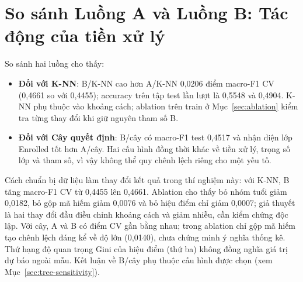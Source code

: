 \section{So sánh Luồng A và Luồng B: Tác động của tiền xử lý}
So sánh hai luồng cho thấy:
\begin{itemize}
    \item \textbf{Đối với K-NN}: B/K-NN cao hơn A/K-NN 0,0206 điểm macro-F1 CV (0,4661 so với 0,4455); accuracy trên tập test lần lượt là 0,5548 và 0,4904. K-NN phụ thuộc vào khoảng cách; ablation trên train ở Mục~\ref{sec:ablation} kiểm tra từng thay đổi khi giữ nguyên tham số B.
    \item \textbf{Đối với Cây quyết định}: B/cây có macro-F1 test 0,4517 và nhận diện lớp Enrolled tốt hơn A/cây. Hai cấu hình đồng thời khác về tiền xử lý, trọng số lớp và tham số, vì vậy không thể quy chênh lệch riêng cho một yếu tố.
\end{itemize}

Cách chuẩn bị dữ liệu làm thay đổi kết quả trong thí nghiệm này: với K-NN, B tăng macro-F1 CV từ 0,4455 lên 0,4661. Ablation cho thấy bỏ nhóm tuổi giảm 0,0182, bỏ gộp mã hiếm giảm 0,0076 và bỏ hiệu điểm chỉ giảm 0,0007; giả thuyết là hai thay đổi đầu điều chỉnh khoảng cách và giảm nhiễu, cần kiểm chứng độc lập. Với cây, A và B có điểm CV gần bằng nhau; trong ablation chỉ gộp mã hiếm tạo chênh lệch đáng kể về độ lớn (0,0140), chưa chứng minh ý nghĩa thống kê. Thứ hạng độ quan trọng Gini của hiệu điểm (thứ ba) không đồng nghĩa giá trị dự báo ngoài mẫu. Kết luận về B/cây phụ thuộc cấu hình được chọn (xem Mục~\ref{sec:tree-sensitivity}).


